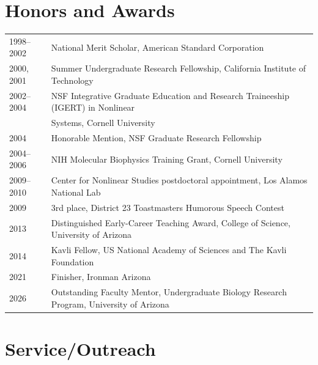 \documentclass[11pt]{article}
\begin{document}
\section*{Honors and Awards}
\begin{longtable}[l]{l l}
1998--2002 & National Merit Scholar, American Standard Corporation\\
2000, 2001      & Summer Undergraduate Research Fellowship, California Institute of Technology\\
2002--2004 & NSF Integrative Graduate Education and Research Traineeship (IGERT) in Nonlinear\\
                  & Systems, Cornell University\\
2004      & Honorable Mention, NSF Graduate Research Fellowship\\
2004--2006 & NIH Molecular Biophysics Training Grant, Cornell University\\
2009--2010 & Center for Nonlinear Studies postdoctoral appointment, Los Alamos National Lab\\
2009 & 3rd place, District 23 Toastmasters Humorous Speech Contest\\
2013 & Distinguished Early-Career Teaching Award, College of Science, University of Arizona\\
2014 & Kavli Fellow, US National Academy of Sciences and The Kavli Foundation\\
2021 & Finisher, Ironman Arizona\\ %
2026 & Outstanding Faculty Mentor, Undergraduate Biology Research Program, University of Arizona\\ 
\end{longtable}

\section*{Service/Outreach}
\end{document}
